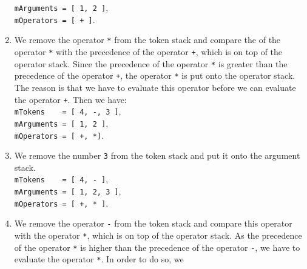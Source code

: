 \begin{enumerate}
      \hspace*{1.3cm} \texttt{mArguments = [ 1, 2 ]}, \\[0.2cm]
      \hspace*{1.3cm} \texttt{mOperators = [ + ]}. 
\item We remove the operator \texttt{*} from the  token stack and compare the
       of the operator \texttt{*} with the precedence of the operator
      \texttt{+}, which is on top of the operator stack.  Since the precedence of the operator 
      \texttt{*} is greater than the precedence of the operator 
      \texttt{+}, the operator \texttt{*} is put onto
      the operator stack.  The reason is that we have to evaluate this operator before we can
      evaluate the operator \texttt{+}.  Then we have: 
      \\[0.2cm]
      \hspace*{1.3cm} \texttt{mTokens \ \ \ = [ 4, -, 3 ]}, \\[0.2cm]
      \hspace*{1.3cm} \texttt{mArguments = [ 1, 2 ]}, \\[0.2cm]
      \hspace*{1.3cm} \texttt{mOperators = [ +, *]}. 
\item We remove the number \texttt{3} from the  token stack and put it onto the argument stack.
      \\[0.2cm]
      \hspace*{1.3cm} \texttt{mTokens \ \ \ = [ 4, - ]}, \\[0.2cm]
      \hspace*{1.3cm} \texttt{mArguments = [ 1, 2, 3 ]}, \\[0.2cm]
      \hspace*{1.3cm} \texttt{mOperators = [ +, * ]}. 
\item We remove the operator \texttt{-} from the token stack and
      compare this operator with the operator \texttt{*}, which is on top of
      the operator stack.  As the precedence of the  operator \texttt{*} is
      higher than the precedence of the operator \texttt{-},
      we have to evaluate the operator \texttt{*}.  In order to do so, we

\end{enumerate}
